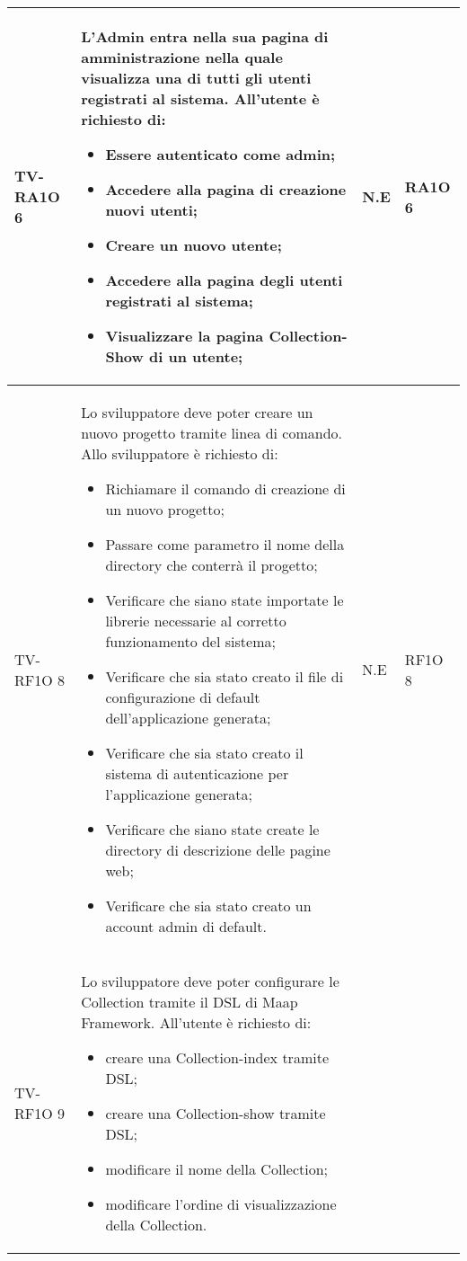 \begin{center}
\begin{longtable}{| p{3cm} | p{6cm} | p{1.5cm} | p{2cm} | }
				TV-RA1O 6 & 
				L'Admin entra nella sua pagina di amministrazione nella quale visualizza una \glossario{Collection-Index} di tutti gli utenti registrati al sistema.
All'utente è richiesto di:
\begin{itemize}
\item Essere autenticato come admin;
\item Accedere alla pagina di creazione nuovi utenti;
\item Creare un nuovo utente;
\item Accedere alla pagina degli utenti registrati al sistema;
\item Visualizzare la pagina Collection-Show di un utente;
\end{itemize}
 & N.E & RA1O 6\newline  \\ \hline 
				TV-RF1O 8 & 
				Lo sviluppatore deve poter creare un nuovo progetto tramite linea di comando.
\newline
Allo sviluppatore è richiesto di:
\begin{itemize}
\item Richiamare il comando di creazione di un nuovo progetto;
\item Passare come parametro il nome della directory che conterrà il progetto;
\item Verificare che siano state importate le librerie necessarie al corretto funzionamento del sistema;
\item Verificare che sia stato creato il file di configurazione di default dell’applicazione generata;
\item Verificare che sia stato creato il sistema di autenticazione per l’applicazione generata;
\item Verificare che siano state create le directory di descrizione delle pagine web;
\item Verificare che sia stato creato un account admin di default.
\end{itemize} & N.E & RF1O 8\newline  \\ \hline 
				TV-RF1O 9 & 
				Lo sviluppatore deve poter configurare le Collection tramite il DSL di Maap Framework.
All'utente è richiesto di:
\begin{itemize}
\item creare una Collection-index tramite DSL;
\item creare una Collection-show tramite DSL;
\item modificare il nome della Collection;
\item modificare l'ordine di visualizzazione della Collection.

\end{itemize}
\end{longtable}
\end{center}
